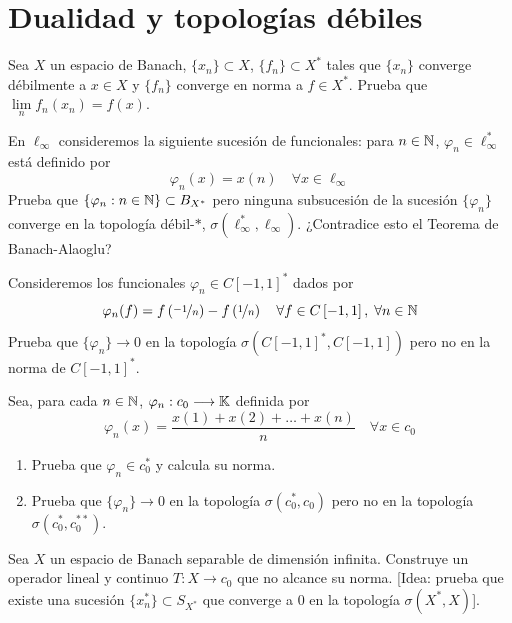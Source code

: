 \section{Dualidad y topologías débiles}

\begin{ejercicio}
Sea $X$ un espacio de Banach, $\{x_n\} \subset X$, $\{f_n\} \subset X^*$ tales que $\{x_n\}$ converge débilmente a $x \in X$ y $\{f_n\}$ converge en norma a $f \in X^*$. Prueba que $\lim\limits_n f_n(x_n) = f(x)$.
\end{ejercicio}

\begin{ejercicio}
En $\ell_\infty$ consideremos la siguiente sucesión de funcionales: para $n \in \mathbb{N}$, $\varphi_n \in \ell_\infty^*$ está definido por
\[
\varphi_n(x) = x(n) \quad \forall x \in \ell_\infty
\]
Prueba que $\{\varphi_n : n \in \mathbb{N}\} \subset B_{X^*}$ pero ninguna subsucesión de la sucesión $\{\varphi_n\}$ converge en la topología débil-$*$, $\sigma(\ell_\infty^*, \ell_\infty)$. ¿Contradice esto el Teorema de Banach-Alaoglu?
\end{ejercicio}

\begin{ejercicio}
Consideremos los funcionales $\varphi_n \in C\left[-1, 1\right]^*$ dados por
\[
\varphi_n(f) = f\left(\nicefrac{-1}{n}\right) - f\left(\nicefrac{1}{n}\right) \quad \forall f \in C\left[-1, 1\right], \; \forall n \in \mathbb{N}
\]
Prueba que $\{\varphi_n\} \longrightarrow 0$ en la topología $\sigma(C\left[-1, 1\right]^*, C\left[-1, 1\right])$ pero no en la norma de $C\left[-1, 1\right]^*$.
\end{ejercicio}

\begin{ejercicio}
Sea, para cada $n \in \mathbb{N}$, $\varphi_n: c_0 \longrightarrow \mathbb{K}$ definida por
\[
\varphi_n(x) = \frac{x(1) + x(2) + \dots + x(n)}{n} \quad \forall x \in c_0
\]
\begin{enumerate}[label=\textbf{\alph*)}]
    \item Prueba que $\varphi_n \in c_0^*$ y calcula su norma.
    \item Prueba que $\{\varphi_n\} \longrightarrow 0$ en la topología $\sigma(c_0^*, c_0)$ pero no en la topología $\sigma(c_0^*, c_0^{**})$.
\end{enumerate}
\end{ejercicio}

\begin{ejercicio}
Sea $X$ un espacio de Banach separable de dimensión infinita. Construye un operador lineal y continuo $T: X \longrightarrow c_0$ que no alcance su norma. [Idea: prueba que existe una sucesión $\{x_n^*\} \subset S_{X^*}$ que converge a $0$ en la topología $\sigma(X^*, X)$].
\end{ejercicio}